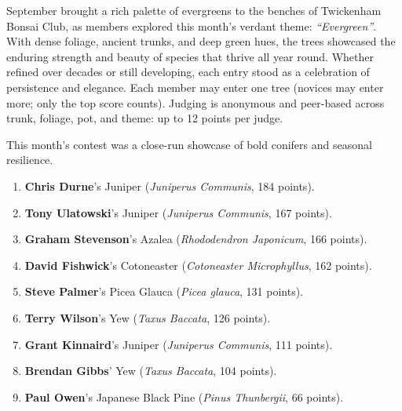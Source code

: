 \label{2025-09-contest}
\noindent
September brought a rich palette of evergreens to the benches of Twickenham Bonsai Club, as members explored this month's verdant theme: \textit{``Evergreen''}.
With dense foliage, ancient trunks, and deep green hues, the trees showcased the enduring strength and beauty of species that thrive all year round.
Whether refined over decades or still developing, each entry stood as a celebration of persistence and elegance.
Each member may enter one tree (novices may enter more; only the top score counts).
Judging is anonymous and peer\--based across trunk, foliage, pot, and theme: up to 12 points per judge.

\noindent
This month's contest was a close\--run showcase of bold conifers and seasonal resilience.

\begin{enumerate}
    \item \textbf{Chris Durne}'s Juniper (\textit{Juniperus Communis}, 184 points).
    
    \item \textbf{Tony Ulatowski}'s Juniper (\textit{Juniperus Communis}, 167 points).

    \item \textbf{Graham Stevenson}'s Azalea (\textit{Rhododendron Japonicum}, 166 points).

    \item \textbf{David Fishwick}'s Cotoneaster (\textit{Cotoneaster Microphyllus}, 162 points).

    \item \textbf{Steve Palmer}'s Picea Glauca (\textit{Picea glauca}, 131 points).

    \item \textbf{Terry Wilson}'s Yew (\textit{Taxus Baccata}, 126 points).

    \item \textbf{Grant Kinnaird}'s Juniper (\textit{Juniperus Communis}, 111 points).

    \item \textbf{Brendan Gibbs}' Yew (\textit{Taxus Baccata}, 104 points).

    \item \textbf{Paul Owen}'s Japanese Black Pine (\textit{Pinus Thunbergii}, 66 points).
\end{enumerate}

